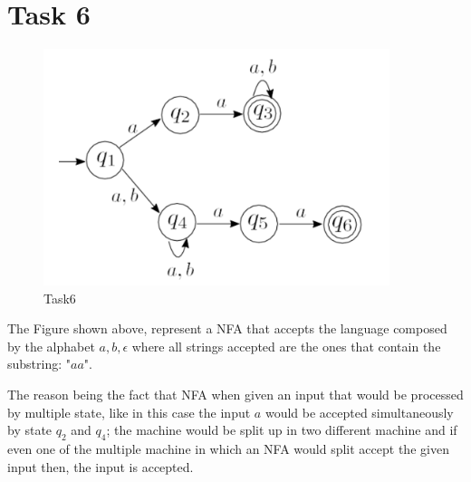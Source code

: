 \chapter{Task 6}
\begin{figure}[hbt]	
\label{Task6}
  \centering\includegraphics[width=0.9\textwidth]{Immagini/fsm_task6.png}
  \caption{Task6}
\end{figure}
The Figure shown above, represent a NFA that accepts the language composed by the alphabet ${a,b, \epsilon}$ where all strings accepted are the ones that contain the substring: "$aa$".

The reason being the fact that NFA when given an input that would be processed by multiple state, like in this case the input $a$ would be accepted simultaneously by state $q_2$ and $q_4$; the machine would be split up in two different machine and if even one of the multiple machine in which an NFA would split accept the given input then, the input is accepted.